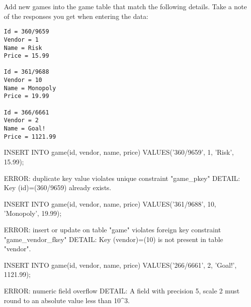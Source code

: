 Add new games into the game table that match the following details. Take a note of the responses you get when entering the data:
\begin{verbatim}
Id = 360/9659
Vendor = 1
Name = Risk
Price = 15.99

Id = 361/9688
Vendor = 10
Name = Monopoly
Price = 19.99

Id = 366/6661
Vendor = 2
Name = Goal!
Price = 1121.99
\end{verbatim}

\begin{sql}
INSERT INTO game(id, vendor, name, price)
VALUES('360/9659', 1, 'Risk', 15.99);
\end{sql}
\begin{pseudo}
ERROR:  duplicate key value violates unique constraint "game_pkey"
DETAIL:  Key (id)=(360/9659) already exists.
\end{pseudo}
\begin{sql}
INSERT INTO game(id, vendor, name, price)
VALUES('361/9688', 10, 'Monopoly', 19.99);
\end{sql}
\begin{pseudo}
ERROR:  insert or update on table "game" violates foreign key constraint "game_vendor_fkey"
DETAIL:  Key (vendor)=(10) is not present in table "vendor".
\end{pseudo}
\begin{sql}
INSERT INTO game(id, vendor, name, price)
VALUES('266/6661', 2, 'Goal!', 1121.99);
\end{sql}
\begin{pseudo}
ERROR:  numeric field overflow
DETAIL:  A field with precision 5, scale 2 must round to an absolute value less than 10^3.
\end{pseudo}